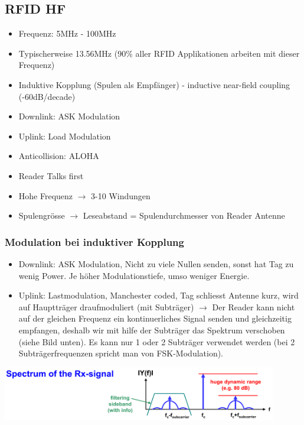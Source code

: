\subsection{RFID HF}
	\begin{itemize}
		\item Frequenz: 5MHz - 100MHz
		\item Typischerweise 13.56MHz (90\% aller RFID Applikationen arbeiten mit dieser Frequenz)
		\item Induktive Kopplung (Spulen als Empfänger) - inductive near-field coupling (-60dB/decade)
		\item Downlink: ASK Modulation
		\item Uplink: Load Modulation
		\item Anticollision: ALOHA
		\item Reader Talks first
		\item Hohe Frequenz $\rightarrow$ 3-10 Windungen
		\item Spulengrösse $\rightarrow$ Leseabstand = Spulendurchmesser von Reader Antenne
	\end{itemize}
\subsubsection{Modulation bei induktiver Kopplung}
	\begin{itemize}
		\item Downlink: ASK Modulation, Nicht zu viele Nullen senden, sonst hat Tag zu wenig Power. Je höher Modulationstiefe, umso weniger Energie. 
		\item Uplink: Lastmodulation, Manchester coded, Tag schliesst Antenne kurz, wird auf Hauptträger draufmoduliert (mit Subträger) $\rightarrow$
		Der Reader kann nicht auf der gleichen Frequenz ein kontinuerliches Signal senden und gleichzeitig empfangen, deshalb wir mit hilfe der Subträger
		das Spektrum verschoben (siehe Bild unten). Es kann nur 1 oder 2 Subträger verwendet werden (bei 2 Subträgerfrequenzen spricht man von FSK-Modulation).
	\end{itemize}
	
	\begin{minipage}{12cm}
		\includegraphics[width=12cm]{./bilder/rfid-spectrum.png} 
	\end{minipage}
	
